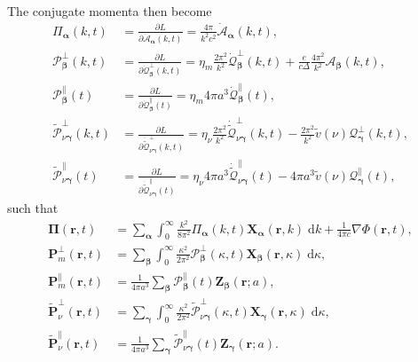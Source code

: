 \documentclass{article}
\begin{document}
The conjugate momenta then become
\begin{equation}
\begin{split}
\mathit{\Pi}_{\bm{\alpha}}(k,t) &= \frac{\partial L}{\partial \dot{\mathcal{A}}_{\bm{\alpha}}(k,t)} = \frac{4\pi}{k^2c^2}\dot{\mathcal{A}}_{\bm{\alpha}}(k,t),\\
\mathcal{P}_{\bm{\beta}}^\perp(k,t) &= \frac{\partial L}{\partial \dot{\mathcal{Q}}_{\bm{\beta}}^\perp(k,t)} = \eta_m\frac{2\pi^2}{k^2}\dot{\mathcal{Q}}_{\bm{\beta}}^\perp(k,t) + \frac{e}{c\Delta}\frac{4\pi^2}{k^2}\mathcal{A}_{\bm{\beta}}(k,t),\\
\mathcal{P}_{\bm{\beta}}^\parallel(t) &= \frac{\partial L}{\partial \dot{\mathcal{Q}}_{\bm{\beta}}^\parallel(t)} = \eta_m4\pi a^3\dot{\mathcal{Q}}_{\bm{\beta}}^\parallel(t),\\
\tilde{\mathcal{P}}_{\nu\bm{\gamma}}^\perp(k,t) &= \frac{\partial L}{\partial \dot{\tilde{\mathcal{Q}}}_{\nu\bm{\gamma}}^\perp(k,t)} = \eta_\nu\frac{2\pi^2}{k^2}\dot{\tilde{\mathcal{Q}}}_{\nu\bm{\gamma}}^\perp(k,t) - \frac{2\pi^2}{k^2}\tilde{v}(\nu)\mathcal{Q}_{\bm{\gamma}}^\perp(k,t),\\
\tilde{\mathcal{P}}_{\nu\bm{\gamma}}^\parallel(t) &= \frac{\partial L}{\partial \dot{\tilde{\mathcal{Q}}}_{\nu\bm{\gamma}}^\parallel(t)} = \eta_\nu 4\pi a^3\dot{\tilde{\mathcal{Q}}}_{\nu\bm{\gamma}}^\parallel(t) - 4\pi a^3\tilde{v}(\nu)\mathcal{Q}_{\bm{\gamma}}^\parallel(t),
\end{split}
\end{equation}
such that
\begin{equation}
\begin{split}
\bm{\Pi}(\mathbf{r},t) &= \sum_{\bm{\alpha}}\int_0^\infty \frac{k^2}{8\pi^2}\mathit{\Pi}_{\bm{\alpha}}(k,t)\mathbf{X}_{\bm{\alpha}}(\mathbf{r},k)\;\mathrm{d}k + \frac{1}{4\pi c}\nabla\Phi(\mathbf{r},t),\\
\mathbf{P}_m^\perp(\mathbf{r},t) &= \sum_{\bm{\beta}}\int_0^\infty\frac{\kappa^2}{2\pi^2}\mathcal{P}_{\bm{\beta}}^\perp(\kappa,t)\mathbf{X}_{\bm{\beta}}(\mathbf{r},\kappa)\;\mathrm{d}\kappa,\\
\mathbf{P}_m^\parallel(\mathbf{r},t) &= \frac{1}{4\pi a^3}\sum_{\bm{\beta}}\mathcal{P}_{\bm{\beta}}^\parallel(t)\mathbf{Z}_{\bm{\beta}}(\mathbf{r};a),\\
\tilde{\mathbf{P}}_\nu^\perp(\mathbf{r},t) &= \sum_{\bm{\gamma}}\int_0^\infty\frac{\kappa^2}{2\pi^2}\tilde{\mathcal{P}}_{\nu\bm{\gamma}}^\perp(\kappa,t)\mathbf{X}_{\bm{\gamma}}(\mathbf{r},\kappa)\;\mathrm{d}\kappa,\\
\tilde{\mathbf{P}}_\nu^\parallel(\mathbf{r},t) &= \frac{1}{4\pi a^3}\sum_{\bm{\gamma}}\tilde{\mathcal{P}}_{\nu\bm{\gamma}}^\parallel(t)\mathbf{Z}_{\bm{\gamma}}(\mathbf{r};a).
\end{split}
\end{equation}
\end{document}
